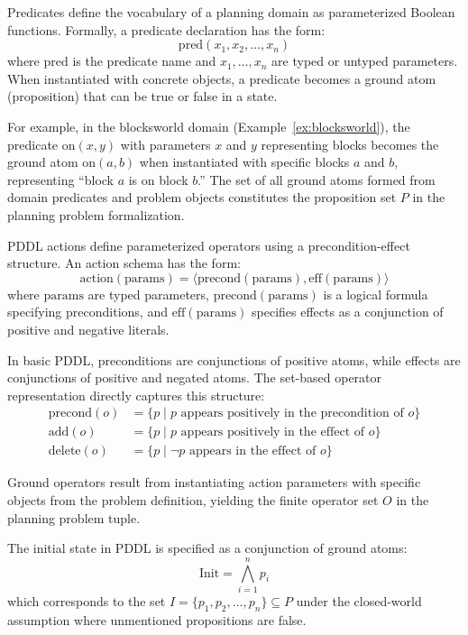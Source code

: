 Predicates define the vocabulary of a planning domain as parameterized Boolean functions. Formally, a predicate declaration has the form:
\begin{equation*}
    \text{pred}(x_1, x_2, \ldots, x_n)
\end{equation*}
where $\text{pred}$ is the predicate name and $x_1, \ldots, x_n$ are typed or untyped parameters. When instantiated with concrete objects, a predicate becomes a ground atom (proposition) that can be true or false in a state.

For example, in the blocksworld domain (Example~\ref{ex:blocksworld}), the predicate $\text{on}(x, y)$ with parameters $x$ and $y$ representing blocks becomes the ground atom $\text{on}(a, b)$ when instantiated with specific blocks $a$ and $b$, representing ``block $a$ is on block $b$.'' The set of all ground atoms formed from domain predicates and problem objects constitutes the proposition set $P$ in the planning problem formalization.

\ac{PDDL} actions define parameterized operators using a precondition-effect structure. An action schema has the form:
\begin{equation*}
    \text{action}(\text{params}) = \langle \text{precond}(\text{params}), \text{eff}(\text{params}) \rangle
\end{equation*}
where $\text{params}$ are typed parameters, $\text{precond}(\text{params})$ is a logical formula specifying preconditions, and $\text{eff}(\text{params})$ specifies effects as a conjunction of positive and negative literals.

In basic \ac{PDDL}, preconditions are conjunctions of positive atoms, while effects are conjunctions of positive and negated atoms. The set-based operator representation directly captures this structure:
\begin{align*}
    \text{precond}(o) & = \{p \mid p \text{ appears positively in the precondition of } o\} \\
    \text{add}(o)     & = \{p \mid p \text{ appears positively in the effect of } o\}       \\
    \text{delete}(o)  & = \{p \mid \neg p \text{ appears in the effect of } o\}
\end{align*}

Ground operators result from instantiating action parameters with specific objects from the problem definition, yielding the finite operator set $O$ in the planning problem tuple.

The initial state in \ac{PDDL} is specified as a conjunction of ground atoms:
\begin{equation*}
    \text{Init} = \bigwedge_{i=1}^{n} p_i
\end{equation*}
which corresponds to the set $I = \{p_1, p_2, \ldots, p_n\} \subseteq P$ under the closed-world assumption where unmentioned propositions are false.

